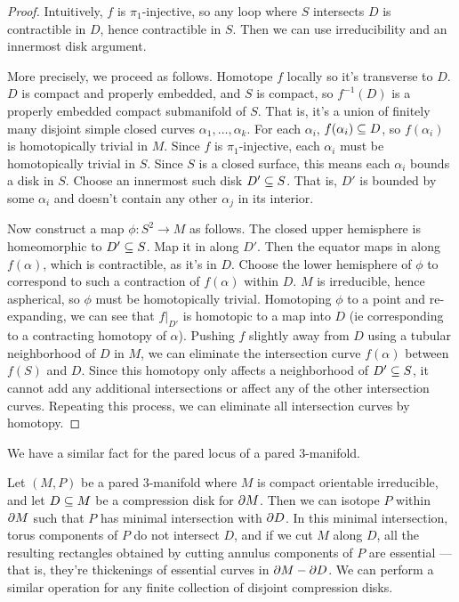 \begin{proof}

Intuitively, $f$ is $\pi_1$-injective, so any loop where $S$ intersects $D$ is
contractible in $D$, hence contractible in $S$. Then we can use irreducibility
and an innermost disk argument.

More precisely, we proceed as follows. Homotope $f$ locally so it's transverse
to $D$. $D$ is compact and properly embedded, and $S$ is compact, so
$f^{-1}(D)$ is a properly embedded compact submanifold of $S$. That is, it's
a union of finitely many disjoint simple closed curves
$\alpha_1,\dots,\alpha_k$.  For each $\alpha_i$, $f(\alpha_i) \subseteq D$, so
$f(\alpha_i)$ is homotopically trivial in $M$.  Since $f$ is $\pi_1$-injective,
each $\alpha_i$ must be homotopically trivial in $S$.  Since $S$ is a closed
surface, this means each $\alpha_i$ bounds a disk in $S$.  Choose an innermost
such disk $D' \subseteq S$. That is, $D'$ is bounded by some $\alpha_i$ and doesn't
contain any other $\alpha_j$ in its interior.

Now construct a map $\phi \colon S^2 \to M$ as follows. The closed upper
hemisphere is homeomorphic to $D' \subseteq S$. Map it in along $D'$. Then the
equator maps in along $f(\alpha)$, which is contractible, as it's in $D$.
Choose the lower hemisphere of $\phi$ to correspond to such a contraction of
$f(\alpha)$ within $D$.  $M$ is irreducible, hence aspherical, so $\phi$ must
be homotopically trivial.  Homotoping $\phi$ to a point and re-expanding, we
can see that $f|_{D'}$ is homotopic to a map into $D$ (ie corresponding to
a contracting homotopy of $\alpha$). Pushing $f$ slightly away from $D$ using
a tubular neighborhood of $D$ in $M$, we can eliminate the intersection curve
$f(\alpha)$ between $f(S)$ and $D$.  Since this homotopy only affects
a neighborhood of $D' \subseteq S$, it cannot add any additional intersections or
affect any of the other intersection curves.  Repeating this process, we can
eliminate all intersection curves by homotopy.

\end{proof}

We have a similar fact for the pared locus of a pared $3$-manifold.

\begin{prop}\label{P:pared1}

Let $(M,P)$ be a pared $3$-manifold where $M$ is compact orientable
irreducible, and let $D \subseteq M$ be a compression disk for $\partial M$. Then we can
isotope $P$ within $\partial M$ such that $P$ has minimal intersection with $\partial D$.
In this minimal intersection, torus components of $P$ do not intersect $D$, and
if we cut $M$ along $D$, all the resulting rectangles obtained by cutting
annulus components of $P$ are essential --- that is, they're thickenings of
essential curves in $\partial M - \partial D$.  We can perform a similar operation for
any finite collection of disjoint compression disks.

\end{prop}


